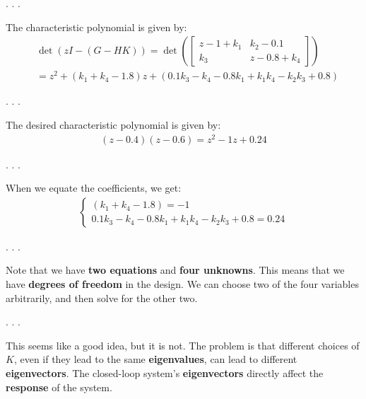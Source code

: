 \documentclass[
  letterpaper,
  DIV=11,
  numbers=noendperiod,
  oneside]{scrartcl}
\begin{document}
. . .

The characteristic polynomial is given by: \[
\begin{align*}
&\det(zI - (G-HK)) = \det\left(\begin{bmatrix} z-1+k_1 & k_2-0.1 \\ k_3 & z-0.8+k_4\end{bmatrix}\right) \\
&= z^2 + (k_1 + k_4 - 1.8)z + (0.1k_3 - k_4 - 0.8k_1 + k_1k_4 - k_2k_3 + 0.8)
\end{align*}
\]

. . .

The desired characteristic polynomial is given by: \[
\begin{align*}
(z-0.4)(z-0.6) = z^2 - 1z + 0.24
\end{align*}
\]

. . .

When we equate the coefficients, we get: \[
\begin{align*}
\begin{cases}
(k_1 + k_4 - 1.8) = -1 \\
0.1k_3 - k_4 - 0.8k_1 + k_1k_4 - k_2k_3 + 0.8 = 0.24
\end{cases}
\end{align*}
\]

. . .

\begin{tcolorbox}[enhanced jigsaw, rightrule=.15mm, coltitle=black, titlerule=0mm, breakable, title=\textcolor{quarto-callout-important-color}{\faExclamation}\hspace{0.5em}{Important}, bottomrule=.15mm, colback=white, toprule=.15mm, opacityback=0, opacitybacktitle=0.6, leftrule=.75mm, left=2mm, colbacktitle=quarto-callout-important-color!10!white, bottomtitle=1mm, toptitle=1mm, arc=.35mm, colframe=quarto-callout-important-color-frame]

Note that we have \textbf{two equations} and \textbf{four unknowns}.
This means that we have \textbf{degrees of freedom} in the design. We
can choose two of the four variables arbitrarily, and then solve for the
other two.

\end{tcolorbox}

. . .

This seems like a good idea, but it is not. The problem is that
different choices of \(K\), even if they lead to the same
\textbf{eigenvalues}, can lead to different \textbf{eigenvectors}. The
closed-loop system's \textbf{eigenvectors} directly affect the
\textbf{response} of the system.
\end{document}
